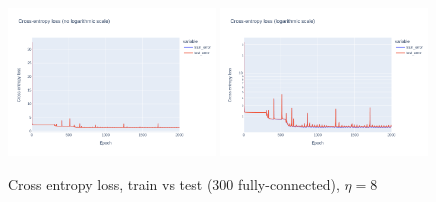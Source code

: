 \documentclass[12pt]{article}
\begin{document}
\begin{figure}[ht]
  \centering
  \includegraphics[width=0.49\textwidth]{images/cross-entropy-comparison-1-300-lr8.png}
  \includegraphics[width=0.49\textwidth]{images/cross-entropy-comparison-1-300-lr8-log.png}
  \caption{Cross entropy loss, train vs test ($300$ fully-connected), $\eta = 8$}
  \label{fig: learning rate comparison 8}
\end{figure}
\end{document}
